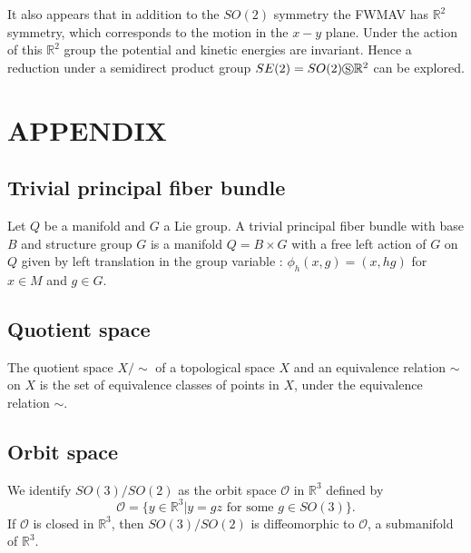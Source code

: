 \documentclass[letterpaper, 10 pt, conference]{ieeeconf}  \newcommand{\RN}[1]{\textup{\uppercase\expandafter{\romannumeral#1}}}
\begin{document}
It also appears that in addition to the $SO(2)$ symmetry the FWMAV has $\mathbb{R}^2$ symmetry, which corresponds to the motion in the $x-y$ plane. Under the action of this $\mathbb{R}^2$ group the potential and kinetic energies are invariant. Hence a reduction under a semidirect product group $SE(2)= SO(2) \circledS \mathbb{R}^2$ can be explored.



\section*{APPENDIX}

\subsection{Trivial principal fiber bundle}\label{Trivial principal fiber bundle}
Let $Q$ be a manifold and $G$ a Lie group. A trivial principal fiber bundle with base $B$ and structure group $G$ is a manifold $Q = B \times G$ with a free left action of $G$ on $Q$ given by left translation in the group variable : $\phi_h(x,g) = (x,hg)$ for $x \in M$ and $g \in G$.


\subsection{Quotient space}\label{Quotient space}
The quotient space $X/ \sim$ of a topological space $X$ and an equivalence relation $\sim$ on $X$ is the set of equivalence classes of points in $X$, under the equivalence relation $\sim$.

\subsection{Orbit space}\label{Orbit space}
We identify $SO(3)/SO(2)$ as the orbit space $\mathcal{O}$ in $\mathbb{R}^{3}$ defined by
$$ \mathcal{O} = \{ y \in \mathbb{R}^{3} | y= gz \mbox{ for some } g\in  SO(3) \}. $$
If $\mathcal{O}$ is closed in $\mathbb{R}^{3}$, then $SO(3)/SO(2)$ is diffeomorphic to $\mathcal{O}$, a submanifold of $\mathbb{R}^{3}.$
\end{document}
